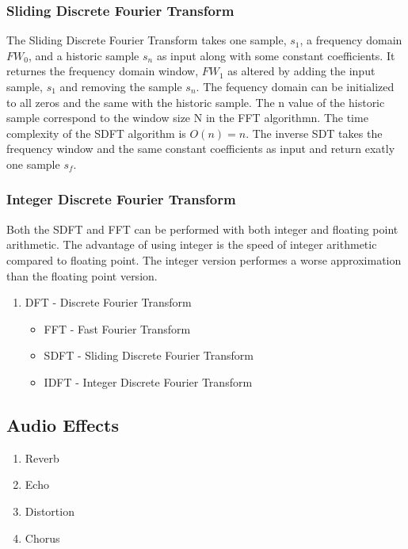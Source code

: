 \subsubsection{Sliding Discrete Fourier Transform}
The Sliding Discrete Fourier Transform takes one sample, $s_1$, a frequency domain $FW_0$, and a historic sample $s_n$ as input along with some constant coefficients. 
It returnes the frequency domain window, $FW_1$ as altered by adding the input sample, $s_1$ and removing the sample $s_n$. The fequency domain
can be initialized to all zeros and the same with the historic sample. The n value of the historic sample correspond to the window size N in the
FFT algorithmn. The time complexity of the SDFT algorithm is $O(n) = n$. The inverse SDT takes the frequency window and the same constant coefficients as input and
return exatly one sample $s_f$.

\subsubsection{Integer Discrete Fourier Transform}
Both the SDFT and FFT can be performed with both integer and floating point arithmetic. The advantage of
using integer is the speed of integer arithmetic compared to floating point. The integer version 
performes a worse approximation than the floating point version.

\begin{enumerate}
\item DFT - Discrete Fourier Transform
	\begin{itemize}
	  \item FFT - Fast Fourier Transform
		\item SDFT - Sliding Discrete Fourier Transform
		\item IDFT - Integer Discrete Fourier Transform
	\end{itemize}
\end{enumerate}

\subsection{Audio Effects}

\begin{enumerate}
	\item Reverb
	\item Echo
	\item Distortion
	\item Chorus
\end{enumerate}

